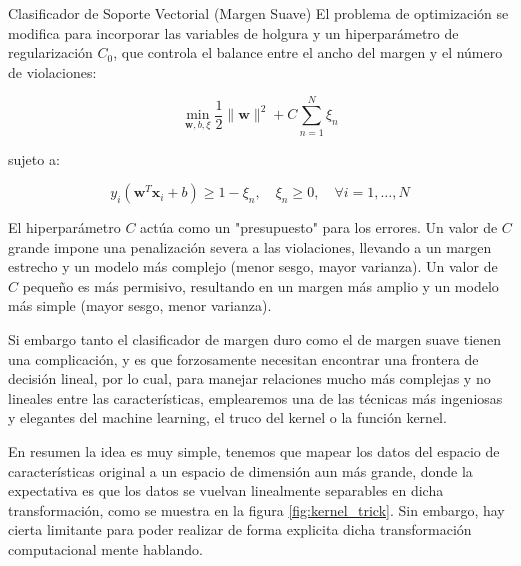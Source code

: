 \begin{definicion}{Clasificador de Soporte Vectorial (Margen Suave)}
	El problema de optimización se modifica para incorporar las variables de holgura y un hiperparámetro de regularización $C_0$, que controla el balance entre el ancho del margen y el número de violaciones:
	
	\begin{equation}
		\min_{\mathbf{w}, b, \xi} \frac{1}{2} \|\mathbf{w}\|^2 + C \sum_{n=1}^{N} \xi_n
	\end{equation}
	
	sujeto a:
	
	\begin{equation}
		y_i(\mathbf{w}^T \mathbf{x}_i + b) \ge 1 - \xi_n, \quad \xi_n \ge 0, \quad \forall i=1, \dots, N
	\end{equation}
	
	El hiperparámetro $C$ actúa como un "presupuesto" para los errores. Un valor de $C$ grande impone una penalización severa a las violaciones, llevando a un margen estrecho y un modelo más complejo (menor sesgo, mayor varianza). Un valor de $C$ pequeño es más permisivo, resultando en un margen más amplio y un modelo más simple (mayor sesgo, menor varianza).
\end{definicion}

Si embargo tanto el clasificador de margen duro como el de margen suave tienen una complicación, y es que forzosamente necesitan encontrar una frontera de decisión lineal, por lo cual, para manejar relaciones mucho más complejas y no lineales entre las características, emplearemos una de las técnicas más ingeniosas y elegantes del machine learning, el truco del kernel o la función kernel.

En resumen la idea es muy simple, tenemos que mapear los datos del espacio de características original a un espacio de dimensión aun más grande, donde la expectativa es que los datos se vuelvan linealmente separables en dicha transformación, como se muestra en la figura \ref{fig:kernel_trick}. Sin embargo, hay cierta limitante para poder realizar de forma explicita dicha transformación computacional mente hablando.

